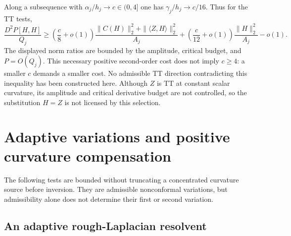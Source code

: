 Along a subsequence with $\alpha_j/h_j\to c\in(0,4]$ one has
$\gamma_j/h_j\to c/16$.  Thus for the TT tests,
\begin{equation}\label{webvar:threshold-spectral-constraint}
 \frac{D^2P[H,H]}{Q_j}\ge
 \left(\frac c8+o(1)\right)
   \frac{\|C(H)\|_2^2+\|\langle Z,H\rangle\|_2^2}{A_j}
 +\left(\frac c{12}+o(1)\right)\frac{\|H\|_2^2}{A_j}-o(1).
\end{equation}
The displayed norm ratios are bounded by the amplitude, critical
budget, and $P=O(Q_j)$.  This necessary positive second-order cost
does not imply $c\ge4$: a smaller $c$ demands a smaller cost.
No admissible TT direction contradicting this inequality has been
constructed here.  Although $Z$ is TT at constant scalar curvature,
its amplitude and critical derivative budget are not controlled,
so the substitution $H=Z$ is not licensed by this selection.

\section{Adaptive variations and positive curvature compensation}
\label{sec:web-curvature-compensation}

The following tests are bounded without truncating a concentrated
curvature source before inversion.  They are admissible nonconformal
variations, but admissibility alone does not determine their first
or second variation.

\subsection{An adaptive rough-Laplacian resolvent}

